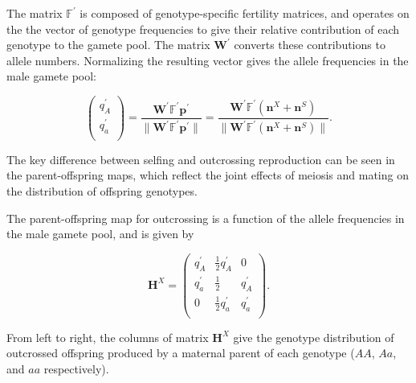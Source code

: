 \documentclass[11pt,draft]{article}
\def\mbf#1{\mathbf{#1}}
\def\mbb#1{\mathbb{#1}}
\def\mcal#1{\mathcal{#1}}
\begin{document}
\noindent The matrix $\mbb{F}^{\prime}$ is composed of genotype-specific fertility matrices, and operates on the the vector of genotype frequencies to give their relative contribution of each genotype to the gamete pool. The matrix $\mbf{W}^{\prime}$ converts these contributions to allele numbers. Normalizing the resulting vector gives the allele frequencies in the male gamete pool:
\begin{linenomath*}
\begin{equation} \label{eq:maleGametePool}
	\left(
		\begin{array}{c}
			q^{\prime}_{A} \\
			q^{\prime}_{a} \\
		\end{array} \right) = 
			\frac{\mbf{W}^{\prime} \mbb{F}^{\prime} \mbf{p}^{\prime}}{\| \mbf{W}^{\prime} \mbb{F}^{\prime} \mbf{p}^{\prime} \|} = 
				\frac{\mbf{W}^{\prime} \mbb{F}^{\prime} (\mbf{n}^X + \mbf{n}^S)}{\| \mbf{W}^{\prime} \mbb{F}^{\prime} (\mbf{n}^X + \mbf{n}^S)\|}.
\end{equation}
\end{linenomath*}
The key difference between selfing and outcrossing reproduction can be seen in the parent-offspring maps, which reflect the joint effects of meiosis and mating on the distribution of offspring genotypes.

The parent-offspring map for outcrossing is a function of the allele frequencies in the male gamete pool, and is given by 
\begin{linenomath*}
\begin{equation} \label{eq:HX}
	\mbf{H}^X = 
			\left(
			\begin{array}{ccc}
				q^{\prime}_{A} & \frac{1}{2} q^{\prime}_{A} & 0 \\
				q^{\prime}_{a} & \frac{1}{2} & q^{\prime}_{A}  \\
				0 & \frac{1}{2} q^{\prime}_{a} & q^{\prime}_{a} \\
			\end{array} \right).
\end{equation}
\end{linenomath*}
\noindent From left to right, the columns of matrix $\mbf{H}^X$ give the genotype distribution of outcrossed offspring produced by a maternal parent of each genotype ($AA$, $Aa$, and $aa$ respectively).
\end{document}

